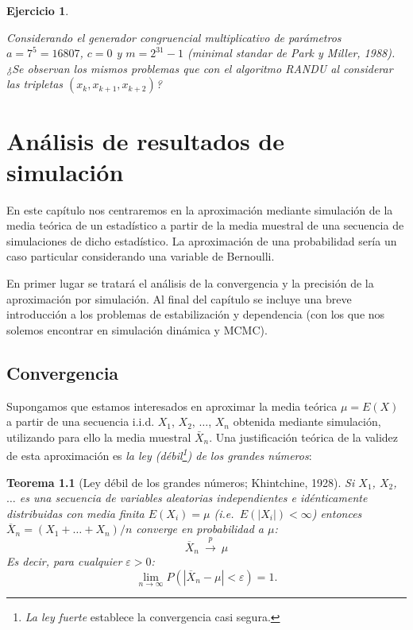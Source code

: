 \documentclass[
]{book}
\theoremstyle{break}
\newtheorem{theorem}{Teorema}[chapter]
\newtheorem{exercise}{Ejercicio}[chapter]
\theoremstyle{nonumberplain}
\begin{document}
\begin{exercise}
\protect\hypertarget{exr:parkmiller}{}\label{exr:parkmiller}

Considerando el generador congruencial multiplicativo de parámetros \(a=7^{5}=16807\), \(c=0\) y \(m=2^{31}-1\) (\emph{minimal standar} de Park y Miller, 1988).
¿Se observan los mismos problemas que con el algoritmo RANDU al considerar las tripletas \((x_{k},x_{k+1},x_{k+2})\)?
\end{exercise}

\hypertarget{resultados}{%
\chapter{Análisis de resultados de simulación}\label{resultados}}

En este capítulo nos centraremos en la aproximación mediante simulación de la media teórica de un estadístico a partir de la media muestral de una secuencia de simulaciones de dicho estadístico.
La aproximación de una probabilidad sería un caso particular considerando una variable de Bernoulli.

En primer lugar se tratará el análisis de la convergencia y la precisión de la aproximación por simulación.
Al final del capítulo se incluye una breve introducción a los problemas de estabilización y dependencia (con los que nos solemos encontrar en simulación dinámica y MCMC).

\hypertarget{convergencia}{%
\section{Convergencia}\label{convergencia}}

Supongamos que estamos interesados en aproximar la media teórica \(\mu = E\left( X\right)\) a partir de una secuencia i.i.d. \(X_{1}\), \(X_{2}\), \(\ldots\), \(X_{n}\) obtenida mediante simulación, utilizando para ello la media muestral \(\bar{X}_{n}\).
Una justificación teórica de la validez de esta aproximación es \emph{la ley (débil\footnote{\emph{La ley fuerte} establece la convergencia casi segura.}) de los grandes números}:

\begin{theorem}[Ley débil de los grandes números; Khintchine, 1928]
\protect\hypertarget{thm:khinchine}{}\label{thm:khinchine}
Si \(X_{1}\), \(X_{2}\), \(\ldots\) es una secuencia de variables aleatorias independientes e idénticamente distribuidas con media finita \(E\left( X_{i}\right) =\mu\) (i.e.~\(E\left( \left\vert X_{i} \right\vert \right) < \infty\)) entonces \(\overline{X}_{n}=\left( X_{1}+\ldots +X_{n}\right) /n\)
converge en probabilidad a \(\mu\): \[\overline{X}_{n}\ \overset{p}{ \longrightarrow }\ \mu\]
Es decir, para cualquier \(\varepsilon >0\):
\[\lim\limits_{n\rightarrow \infty }P\left( \left\vert \overline{X}_{n}-\mu
\right\vert <\varepsilon \right) = 1.\]
\end{theorem}
\end{document}
